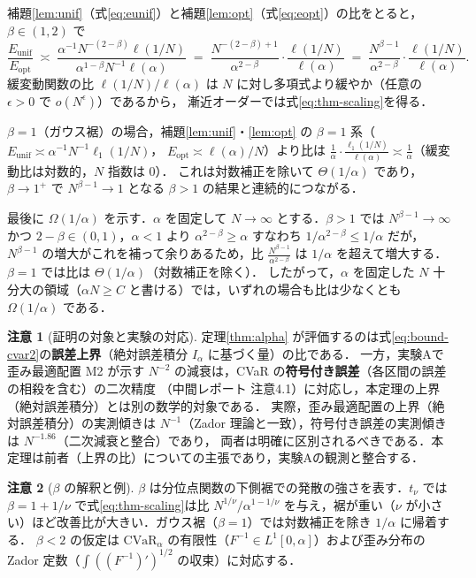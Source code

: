 \documentclass[a4paper,10pt]{jsarticle}
\makeatletter
\theoremstyle{definition}
\newtheorem{remark}{注意}[section]
\renewenvironment{proof}[1][\proofname]{\par
  \pushQED{\qed}%
  \normalfont \topsep6\p@\@plus6\p@\relax
  \trivlist
  \item[\hskip\labelsep\textbf{#1}]\ignorespaces
}{%
  \popQED\endtrivlist\@endpefalse
}
\renewcommand{\proofname}{証明}
\newcommand{\CVaR}{\mathrm{CVaR}}
\newcommand{\Finv}{F^{-1}}
\makeatother
\begin{document}
\begin{proof}[定理\ref{thm:alpha} の証明]
補題\ref{lem:unif}（式\eqref{eq:eunif}）と補題\ref{lem:opt}（式\eqref{eq:eopt}）の比をとると，$\beta\in(1,2)$ で
\begin{equation*}
  \frac{E_{\mathrm{unif}}}{E_{\mathrm{opt}}}
  \;\asymp\;\frac{\alpha^{-1}N^{-(2-\beta)}\ell(1/N)}{\alpha^{1-\beta}N^{-1}\ell(\alpha)}
  \;=\;\frac{N^{-(2-\beta)+1}}{\alpha^{2-\beta}}\cdot\frac{\ell(1/N)}{\ell(\alpha)}
  \;=\;\frac{N^{\beta-1}}{\alpha^{2-\beta}}\cdot\frac{\ell(1/N)}{\ell(\alpha)}.
\end{equation*}
緩変動関数の比 $\ell(1/N)/\ell(\alpha)$ は $N$ に対し多項式より緩やか（任意の $\epsilon>0$ で $o(N^\epsilon)$）であるから，
漸近オーダーでは式\eqref{eq:thm-scaling}を得る．

$\beta=1$（ガウス裾）の場合，補題\ref{lem:unif}・\ref{lem:opt} の $\beta=1$ 系（$E_{\mathrm{unif}}\asymp\alpha^{-1}N^{-1}\ell_1(1/N)$，
$E_{\mathrm{opt}}\asymp\ell(\alpha)/N$）より比は
$\frac1\alpha\cdot\frac{\ell_1(1/N)}{\ell(\alpha)}\asymp\frac1\alpha$（緩変動比は対数的，$N$ 指数は $0$）．
これは対数補正を除いて $\Theta(1/\alpha)$ であり，$\beta\to1^+$ で $N^{\beta-1}\to1$ となる $\beta>1$ の結果と連続的につながる．

最後に $\Omega(1/\alpha)$ を示す．$\alpha$ を固定して $N\to\infty$ とする．$\beta>1$ では $N^{\beta-1}\to\infty$ かつ
$2-\beta\in(0,1)$，$\alpha<1$ より $\alpha^{2-\beta}\ge\alpha$ すなわち $1/\alpha^{2-\beta}\le1/\alpha$ だが，
$N^{\beta-1}$ の増大がこれを補って余りあるため，比 $\frac{N^{\beta-1}}{\alpha^{2-\beta}}$ は $1/\alpha$ を超えて増大する．
$\beta=1$ では比は $\Theta(1/\alpha)$（対数補正を除く）．
したがって，$\alpha$ を固定した $N$ 十分大の領域（$\alpha N\ge C$ と書ける）では，いずれの場合も比は少なくとも $\Omega(1/\alpha)$ である．
\end{proof}

\begin{remark}[証明の対象と実験の対応]
\label{rem:scope}
定理\ref{thm:alpha} が評価するのは式\eqref{eq:bound-cvar2}の\textbf{誤差上界}（絶対誤差積分 $I_\alpha$ に基づく量）の比である．
一方，実験Aで歪み最適配置 M2 が示す $N^{-2}$ の減衰は，CVaR の\textbf{符号付き誤差}（各区間の誤差の相殺を含む）の二次精度
（中間レポート 注意4.1）に対応し，本定理の上界（絶対誤差積分）とは別の数学的対象である．
実際，歪み最適配置の上界（絶対誤差積分）の実測傾きは $N^{-1}$（Zador 理論と一致），符号付き誤差の実測傾きは $N^{-1.86}$（二次減衰と整合）であり，
両者は明確に区別されるべきである．本定理は前者（上界の比）についての主張であり，実験Aの観測と整合する．
\end{remark}

\begin{remark}[$\beta$ の解釈と例]
$\beta$ は分位点関数の下側裾での発散の強さを表す．$t_\nu$ では $\beta=1+1/\nu$ で式\eqref{eq:thm-scaling}は比
$N^{1/\nu}/\alpha^{1-1/\nu}$ を与え，裾が重い（$\nu$ が小さい）ほど改善比が大きい．ガウス裾（$\beta=1$）では対数補正を除き $1/\alpha$ に帰着する．
$\beta<2$ の仮定は $\CVaR_\alpha$ の有限性（$\Finv\in L^1[0,\alpha]$）および歪み分布の Zador 定数（$\int((\Finv)')^{1/2}$ の収束）に対応する．
\end{remark}
\end{document}
